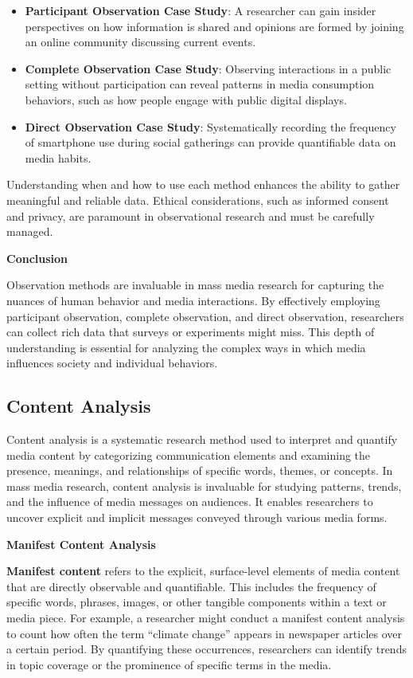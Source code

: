\documentclass[
]{book}
\begin{document}
\begin{itemize}
\item
  \textbf{Participant Observation Case Study}: A researcher can gain insider perspectives on how information is shared and opinions are formed by joining an online community discussing current events.
\item
  \textbf{Complete Observation Case Study}: Observing interactions in a public setting without participation can reveal patterns in media consumption behaviors, such as how people engage with public digital displays.
\item
  \textbf{Direct Observation Case Study}: Systematically recording the frequency of smartphone use during social gatherings can provide quantifiable data on media habits.
\end{itemize}

Understanding when and how to use each method enhances the ability to gather meaningful and reliable data. Ethical considerations, such as informed consent and privacy, are paramount in observational research and must be carefully managed.

\textbf{Conclusion}

Observation methods are invaluable in mass media research for capturing the nuances of human behavior and media interactions. By effectively employing participant observation, complete observation, and direct observation, researchers can collect rich data that surveys or experiments might miss. This depth of understanding is essential for analyzing the complex ways in which media influences society and individual behaviors.

\subsection*{Content Analysis}\label{content-analysis}

Content analysis is a systematic research method used to interpret and quantify media content by categorizing communication elements and examining the presence, meanings, and relationships of specific words, themes, or concepts. In mass media research, content analysis is invaluable for studying patterns, trends, and the influence of media messages on audiences. It enables researchers to uncover explicit and implicit messages conveyed through various media forms.

\textbf{Manifest Content Analysis}

\textbf{Manifest content} refers to the explicit, surface-level elements of media content that are directly observable and quantifiable. This includes the frequency of specific words, phrases, images, or other tangible components within a text or media piece. For example, a researcher might conduct a manifest content analysis to count how often the term ``climate change'' appears in newspaper articles over a certain period. By quantifying these occurrences, researchers can identify trends in topic coverage or the prominence of specific terms in the media.
\end{document}

